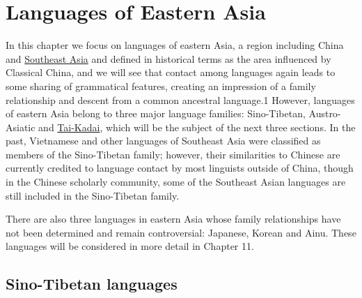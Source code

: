 \chapter{Languages of Eastern Asia}


In this chapter we focus on languages of eastern Asia, a region
including China and \hyperref[ch:southeastasia]{Southeast Asia} and defined 
in historical terms as the area
influenced by Classical China, and we will see that contact among languages
again leads to some sharing of grammatical features, creating an impression of a
family relationship and descent from a common ancestral language.1 However,
languages of eastern Asia belong to three major language families: Sino-Tibetan,
Austro-Asiatic and \hyperref[s:tai-kadai]{Tai-Kadai}, which will be the subject of the next three sections.
In the past, Vietnamese and other languages of Southeast Asia were classified as
members of the Sino-Tibetan family; however, their similarities to Chinese are
currently credited to language contact by most linguists outside of China, though
in the Chinese scholarly community, some of the Southeast Asian languages are
still included in the Sino-Tibetan family.

There are also three languages in eastern Asia whose family relationships have
not been determined and remain controversial: Japanese, Korean and Ainu. These
languages will be considered in more detail in Chapter 11.

\section{Sino-Tibetan languages}

